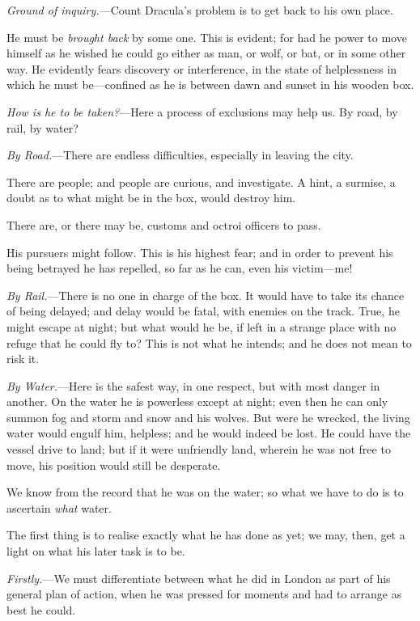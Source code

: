 \noindent\textit{Ground of inquiry.}—Count Dracula's problem is to get back to his own place.
\begin{outline}[enumerate]

\1 He must be \textit{brought back} by some one. This is evident; for had he power to move himself as he wished he could go either as man, or wolf, or bat, or in some other way. He evidently fears discovery or interference, in the state of helplessness in which he must be—confined as he is between dawn and sunset in his wooden box.

\1 \textit{How is he to be taken?}—Here a process of exclusions may help us. By road, by rail, by water?

\2 \textit{By Road.}—There are endless difficulties, especially in leaving the city.

\3 There are people; and people are curious, and investigate. A hint, a surmise, a doubt as to what might be in the box, would destroy him.

\3 There are, or there may be, customs and octroi officers to pass.

\3 His pursuers might follow. This is his highest fear; and in order to prevent his being betrayed he has repelled, so far as he can, even his victim—me!

\2 \textit{By Rail.}—There is no one in charge of the box. It would have to take its chance of being delayed; and delay would be fatal, with enemies on the track. True, he might escape at night; but what would he be, if left in a strange place with no refuge that he could fly to? This is not what he intends; and he does not mean to risk it.

\2 \textit{By Water.}—Here is the safest way, in one respect, but with most danger in another. On the water he is powerless except at night; even then he can only summon fog and storm and snow and his wolves. But were he wrecked, the living water would engulf him, helpless; and he would indeed be lost. He could have the vessel drive to land; but if it were unfriendly land, wherein he was not free to move, his position would still be desperate.
\end{outline}

We know from the record that he was on the water; so what we have to do is to ascertain \textit{what} water.

The first thing is to realise exactly what he has done as yet; we may, then, get a light on what his later task is to be.

\textit{Firstly.}—We must differentiate between what he did in London as part of his general plan of action, when he was pressed for moments and had to arrange as best he could.

